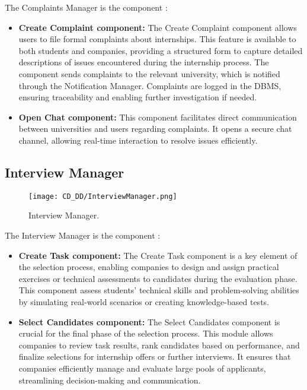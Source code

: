 \noindent The Complaints Manager is the component :

\begin{itemize}
    \item \textbf{Create Complaint component:} The Create Complaint component allows users to file formal complaints about internships. This feature is available to both students and companies, providing a structured form to capture detailed descriptions of issues encountered during the internship process. The component sends complaints to the relevant university, which is notified through the Notification Manager. Complaints are logged in the DBMS, ensuring traceability and enabling further investigation if needed.
    \item \textbf{Open Chat component:} This component facilitates direct communication between universities and users regarding complaints. It opens a secure chat channel, allowing real-time interaction to resolve issues efficiently.
\end{itemize}

\subsection{Interview Manager}
\label{subsec:interview_manager}%

\begin{figure}[H]
    \begin{center}
        \texttt{[image: CD\_DD/InterviewManager.png]}
        \caption{Interview Manager.}
        \label{fig:interview_manager}%
    \end{center}
\end{figure}

\noindent The Interview Manager is the component :

\begin{itemize}
    \item \textbf{Create Task component:} The Create Task component is a key element of the selection process, enabling companies to design and assign practical exercises or technical assessments to candidates during the evaluation phase. This component assess students' technical skills and problem-solving abilities by simulating real-world scenarios or creating knowledge-based tests.
    \item \textbf{Select Candidates component:} The Select Candidates component is crucial for the final phase of the selection process. This module allows companies to review task results, rank candidates based on performance, and finalize selections for internship offers or further interviews. It ensures that companies efficiently manage and evaluate large pools of applicants, streamlining decision-making and communication.
\end{itemize}


